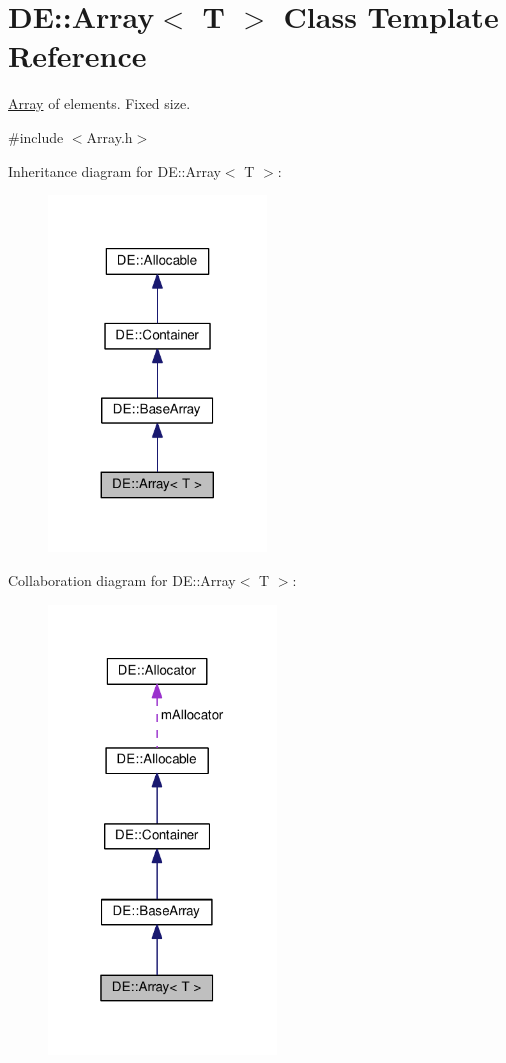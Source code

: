 \hypertarget{classDE_1_1Array}{}\section{DE\+:\+:Array$<$ T $>$ Class Template Reference}
\label{classDE_1_1Array}


\hyperlink{classDE_1_1Array}{Array} of elements. Fixed size.  




{\ttfamily \#include $<$Array.\+h$>$}



Inheritance diagram for DE\+:\+:Array$<$ T $>$\+:
\nopagebreak
\begin{figure}[H]
\begin{center}
\leavevmode
\includegraphics[width=164pt]{classDE_1_1Array__inherit__graph}
\end{center}
\end{figure}


Collaboration diagram for DE\+:\+:Array$<$ T $>$\+:
\nopagebreak
\begin{figure}[H]
\begin{center}
\leavevmode
\includegraphics[width=172pt]{classDE_1_1Array__coll__graph}
\end{center}
\end{figure}
